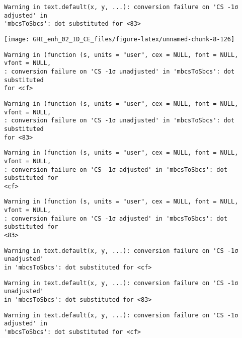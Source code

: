 \documentclass[
  10pt,
  a4paper,oneside]{article}
\begin{document}
\begin{verbatim}
Warning in text.default(x, y, ...): conversion failure on 'CS -1σ adjusted' in
'mbcsToSbcs': dot substituted for <83>
\end{verbatim}

\begin{center}\texttt{[image: GHI\_enh\_02\_ID\_CE\_files/figure-latex/unnamed-chunk-8-126]} \end{center}

\begin{verbatim}
Warning in (function (s, units = "user", cex = NULL, font = NULL, vfont = NULL,
: conversion failure on 'CS -1σ unadjusted' in 'mbcsToSbcs': dot substituted
for <cf>
\end{verbatim}

\begin{verbatim}
Warning in (function (s, units = "user", cex = NULL, font = NULL, vfont = NULL,
: conversion failure on 'CS -1σ unadjusted' in 'mbcsToSbcs': dot substituted
for <83>
\end{verbatim}

\begin{verbatim}
Warning in (function (s, units = "user", cex = NULL, font = NULL, vfont = NULL,
: conversion failure on 'CS -1σ adjusted' in 'mbcsToSbcs': dot substituted for
<cf>
\end{verbatim}

\begin{verbatim}
Warning in (function (s, units = "user", cex = NULL, font = NULL, vfont = NULL,
: conversion failure on 'CS -1σ adjusted' in 'mbcsToSbcs': dot substituted for
<83>
\end{verbatim}

\begin{verbatim}
Warning in text.default(x, y, ...): conversion failure on 'CS -1σ unadjusted'
in 'mbcsToSbcs': dot substituted for <cf>
\end{verbatim}

\begin{verbatim}
Warning in text.default(x, y, ...): conversion failure on 'CS -1σ unadjusted'
in 'mbcsToSbcs': dot substituted for <83>
\end{verbatim}

\begin{verbatim}
Warning in text.default(x, y, ...): conversion failure on 'CS -1σ adjusted' in
'mbcsToSbcs': dot substituted for <cf>
\end{verbatim}
\end{document}
